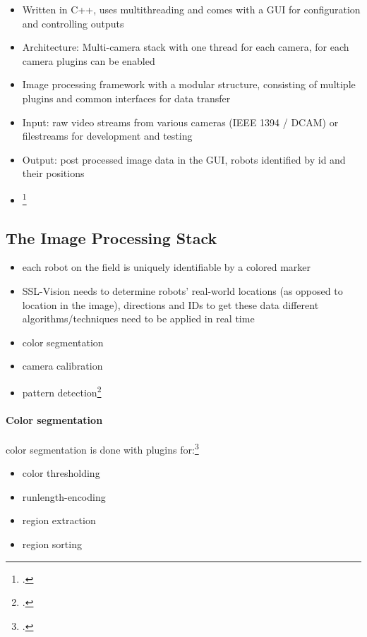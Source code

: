 \begin{itemize}
  \item Written in C++, uses multithreading and comes with a GUI for
  configuration and controlling outputs
  \item Architecture: Multi-camera stack with one thread for each camera, for each camera plugins can be enabled
  \item Image processing framework with a modular structure, consisting of multiple plugins and common interfaces for data transfer
  \item Input: raw video streams from various cameras (IEEE 1394 / DCAM) or filestreams for development and testing
  \item Output: post processed image data in the GUI, robots identified by id and their positions
  \item \footcite[Cf.][]{zickler_ssl_vision}
\end{itemize}

\subsection{The Image Processing Stack}

\begin{itemize}
  \item each robot on the field is uniquely identifiable by a colored marker
  \item SSL-Vision needs to determine robots’ real-world locations (as opposed
        to location in the image), directions and IDs to get these data
        different algorithms/techniques need to be applied in real time
  \item color segmentation
  \item camera calibration
  \item pattern detection\footcite[Cf.][]{zickler_ssl_vision}
\end{itemize}

\paragraph{Color segmentation}
color segmentation is done with plugins for:\footcite[Cf.][]{zickler_ssl_vision}
\begin{itemize}
  \item color thresholding
  \item runlength-encoding 
  \item region extraction
  \item region sorting
\end{itemize}

